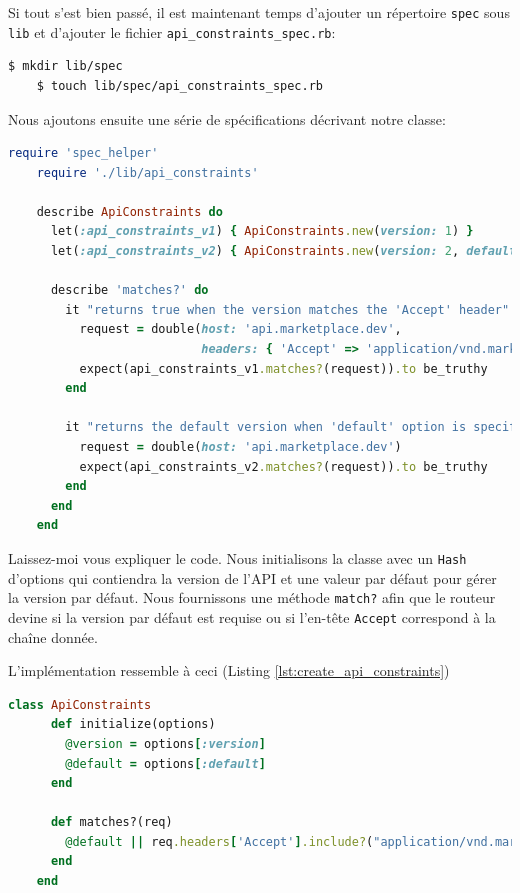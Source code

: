 \documentclass[]{report}
\begin{document}
    Si tout s'est bien passé, il est maintenant temps d'ajouter un répertoire \verb|spec| sous \verb|lib| et d'ajouter le fichier \verb|api_constraints_spec.rb|:

    \begin{scriptsize}
    \begin{lstlisting}[language=bash]
    $ mkdir lib/spec
    $ touch lib/spec/api_constraints_spec.rb
    \end{lstlisting}
    \end{scriptsize}

    Nous ajoutons ensuite une série de spécifications décrivant notre classe:

    \begin{scriptsize}
    \begin{lstlisting}[language=ruby, caption={Test ApiConstraints (lib/spec/api\_constraints\_spec.rb)}, label={lst:create_api_constraints_spec}]
    require 'spec_helper'
    require './lib/api_constraints'

    describe ApiConstraints do
      let(:api_constraints_v1) { ApiConstraints.new(version: 1) }
      let(:api_constraints_v2) { ApiConstraints.new(version: 2, default: true) }

      describe 'matches?' do
        it "returns true when the version matches the 'Accept' header" do
          request = double(host: 'api.marketplace.dev',
                           headers: { 'Accept' => 'application/vnd.marketplace.v1' })
          expect(api_constraints_v1.matches?(request)).to be_truthy
        end

        it "returns the default version when 'default' option is specified" do
          request = double(host: 'api.marketplace.dev')
          expect(api_constraints_v2.matches?(request)).to be_truthy
        end
      end
    end
    \end{lstlisting}
    \end{scriptsize}


    Laissez-moi vous expliquer le code. Nous initialisons la classe avec un \verb|Hash| d'options qui contiendra la version de l'API  et une valeur par défaut pour gérer la version par défaut. Nous fournissons une méthode \verb|match?| afin que le routeur devine si la version par défaut est requise ou si l'en-tête \verb|Accept| correspond à la chaîne donnée.

    L'implémentation ressemble à ceci (Listing \ref{lst:create_api_constraints})

    \begin{scriptsize}
    \begin{lstlisting}[language=ruby, caption={La classe ApiConstraints (lib/api\_constraints.rb)}, label={lst:create_api_constraints}]
    class ApiConstraints
      def initialize(options)
        @version = options[:version]
        @default = options[:default]
      end

      def matches?(req)
        @default || req.headers['Accept'].include?("application/vnd.marketplace.v#{@version}")
      end
    end
    \end{lstlisting}
    \end{scriptsize}
\end{document}
